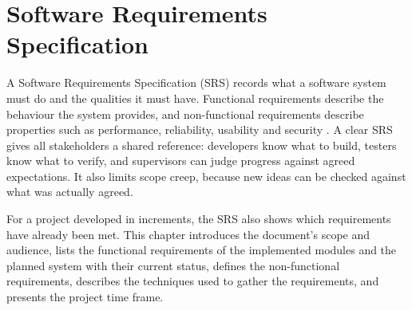 \chapter{Software Requirements Specification}

A Software Requirements Specification (SRS) records what a software system must do and the qualities it must have. Functional requirements describe the behaviour the system provides, and non-functional requirements describe properties such as performance, reliability, usability and security \cite{sommerville2016se,iso29148}. A clear SRS gives all stakeholders a shared reference: developers know what to build, testers know what to verify, and supervisors can judge progress against agreed expectations. It also limits scope creep, because new ideas can be checked against what was actually agreed.

For a project developed in increments, the SRS also shows which requirements have already been met. This chapter introduces the document's scope and audience, lists the functional requirements of the implemented modules and the planned system with their current status, defines the non-functional requirements, describes the techniques used to gather the requirements, and presents the project time frame.
